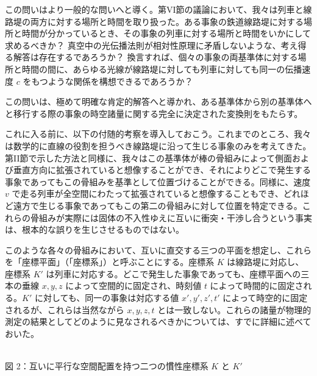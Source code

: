 \documentclass[a4paper,11pt,openany]{ltjsbook}
\begin{document}
この問いはより一般的な問いへと導く。第VI節の議論において、我々は列車と線路堤の両方に対する場所と時間を取り扱った。ある事象の鉄道線路堤に対する場所と時間が分かっているとき、その事象の列車に対する場所と時間をいかにして求めるべきか？ 真空中の光伝播法則が相対性原理に矛盾しないような、考え得る解答は存在するであろうか？ 換言すれば、個々の事象の両基準体に対する場所と時間の間に、あらゆる光線が線路堤に対しても列車に対しても同一の伝播速度 $c$ をもつような関係を構想できるであろうか？

この問いは、極めて明確な肯定的解答へと導かれ、ある基準体から別の基準体へと移行する際の事象の時空諸量に関する完全に決定された変換則をもたらす。

これに入る前に、以下の付随的考察を導入しておこう。これまでのところ、我々は数学的に直線の役割を担うべき線路堤に沿って生じる事象のみを考えてきた。第II節で示した方法と同様に、我々はこの基準体が棒の骨組みによって側面および垂直方向に拡張されていると想像することができ、それによりどこで発生する事象であってもこの骨組みを基準として位置づけることができる。同様に、速度 $v$ で走る列車が全空間にわたって拡張されていると想像することもでき、どれほど遠方で生じる事象であってもこの第二の骨組みに対して位置を特定できる。これらの骨組みが実際には固体の不入性ゆえに互いに衝突・干渉し合うという事実は、根本的な誤りを生じさせるものではない。

このような各々の骨組みにおいて、互いに直交する三つの平面を想定し、これらを「座標平面」（「座標系」）と呼ぶことにする。座標系 $K$ は線路堤に対応し、座標系 $K'$ は列車に対応する。どこで発生した事象であっても、座標平面への三本の垂線 $x, y, z$ によって空間的に固定され、時刻値 $t$ によって時間的に固定される。$K'$ に対しても、同一の事象は対応する値 $x', y', z', t'$ によって時空的に固定されるが、これらは当然ながら $x, y, z, t$ とは一致しない。これらの諸量が物理的測定の結果としてどのように見なされるべきかについては、すでに詳細に述べておいた。



\begin{center}
\\[1mm]
{\small 図 2：互いに平行な空間配置を持つ二つの慣性座標系 $K$ と $K'$}
\end{center}
\end{document}
